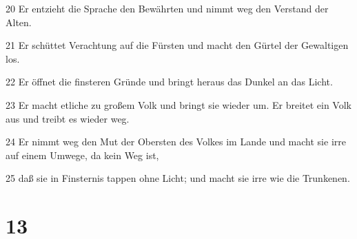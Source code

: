 \par 20 Er entzieht die Sprache den Bewährten und nimmt weg den Verstand der Alten.
\par 21 Er schüttet Verachtung auf die Fürsten und macht den Gürtel der Gewaltigen los.
\par 22 Er öffnet die finsteren Gründe und bringt heraus das Dunkel an das Licht.
\par 23 Er macht etliche zu großem Volk und bringt sie wieder um. Er breitet ein Volk aus und treibt es wieder weg.
\par 24 Er nimmt weg den Mut der Obersten des Volkes im Lande und macht sie irre auf einem Umwege, da kein Weg ist,
\par 25 daß sie in Finsternis tappen ohne Licht; und macht sie irre wie die Trunkenen.

\chapter{13}

